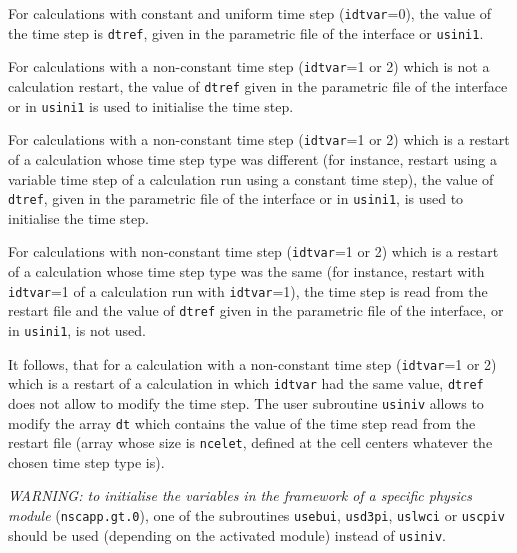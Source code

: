 {{{
\begin{list}{-}{}
\item For calculations with constant and uniform time step
      (\texttt{idtvar}=0), the value of the time step is \texttt{dtref},
      given in the parametric file of the interface or \texttt{usini1}.
\item For calculations with a non-constant time step
      (\texttt{idtvar}=1 or 2) which is not a calculation restart,
      the value of \texttt{dtref} given in the parametric file of the interface
      or in \texttt{usini1} is used to initialise the time step.
\item For calculations with a non-constant time step
      (\texttt{idtvar}=1 or 2) which is a restart of a
      calculation whose time step type was different (for instance, restart
      using a variable time step of a calculation run using a constant time
      step), the value of \texttt{dtref}, given in the parametric file of the
      interface or in \texttt{usini1}, is used to initialise the time step.
\item For calculations with non-constant time step
      (\texttt{idtvar}=1 or 2) which is a restart of a
      calculation whose time step type was the same (for instance, restart with
      \texttt{idtvar}=1 of a calculation run with \texttt{idtvar}=1), the time
      step is read from the restart file and the value of \texttt{dtref} given
      in the parametric file of the interface, or in \texttt{usini1}, is not used.
\end{list}
It follows, that for a calculation with a non-constant time step (\texttt{idtvar}=1
or 2) which is a restart of a calculation in which
\texttt{idtvar} had the same value, \texttt{dtref} does not allow to modify the
time step. The user subroutine \texttt{usiniv} allows to modify the array
\texttt{dt} which contains the value of the time step read from the restart file
(array whose size is \texttt{ncelet}, defined at the cell centers whatever the
chosen time step type is).

{\em WARNING: to initialise the variables in the framework of a
specific physics module} (\texttt{nscapp.gt.0}), 
one of the subroutines
\texttt{usebui}, \texttt{usd3pi}, \texttt{uslwci} or \texttt{uscpiv} 
should be used (depending on the activated module) instead of \texttt{usiniv}.

}}}
